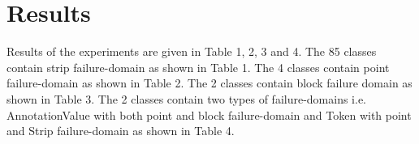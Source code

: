\documentclass[conference]{IEEEtran}
\begin{document}
\section{Results}
Results of the experiments are given in Table 1, 2, 3 and 4. The 85 classes contain strip failure-domain as shown in Table 1.    The 4 classes contain point failure-domain as shown in Table 2. The 2 classes contain block failure domain as shown in Table 3. The 2 classes contain two types of failure-domains i.e. AnnotationValue with both point and block failure-domain and Token with point and Strip failure-domain as shown in Table 4.



\end{document}
